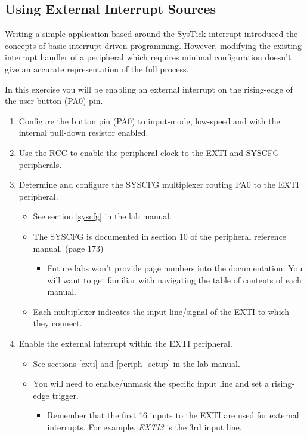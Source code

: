 \documentclass[11pt,fleqn]{book} %
\begin{document}
\subsection{Using External Interrupt Sources}
Writing a simple application based around the SysTick interrupt introduced the concepts of basic interrupt-driven programming. However, modifying the existing interrupt handler of a peripheral which requires minimal configuration doesn't give an accurate representation of the full process.  

In this exercise you will be enabling an external interrupt on the rising-edge of the user button (PA0) pin. 
 
\begin{enumerate}
    \item Configure the button pin (PA0) to input-mode, low-speed and with the internal pull-down resistor enabled. 
    \item Use the RCC to enable the peripheral clock to the EXTI and SYSCFG peripherals.
    \item Determine and configure the SYSCFG multiplexer routing PA0 to the EXTI peripheral.
    \begin{itemize}
        \item See section \ref{syscfg} in the lab manual.
        \item The SYSCFG is documented in section 10 of the peripheral reference manual. (page 173)
        \begin{itemize}
            \item Future labs won't provide page numbers into the documentation. You will want to get familiar with navigating the table of contents of each manual.
        \end{itemize}
        \item Each multiplexer indicates the input line/signal of the EXTI to which they connect.
    \end{itemize}
    \item Enable the external interrupt within the EXTI peripheral.
    \begin{itemize}
        \item See sections \ref{exti} and \ref{periph_setup} in the lab manual.
        \item  You will need to enable/unmask the specific input line and set a rising-edge trigger.
        \begin{itemize}
            \item Remember that the first 16 inputs to the EXTI are used for external interrupts. For example, \textit{EXTI3} is the 3rd input line. 

\end{itemize}
\end{itemize}
\end{enumerate}
\end{document}
